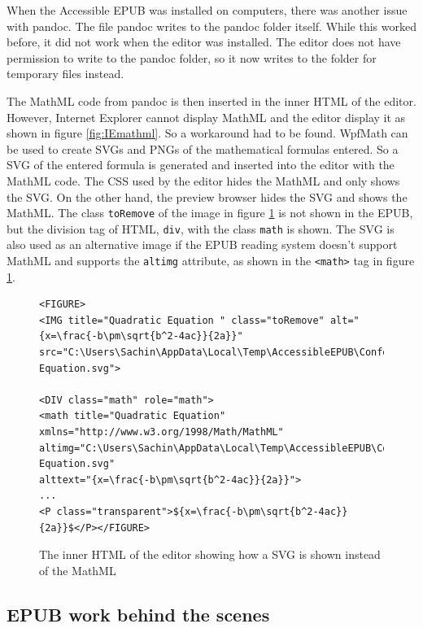 When the Accessible EPUB was installed on computers, there was another issue with pandoc. The file pandoc writes to the pandoc folder itself. While this worked before, it did not work when the editor was installed. The editor does not have permission to write to the pandoc folder, so it now writes to the folder for temporary files instead.

The MathML code from pandoc is then inserted in the inner HTML of the editor. However, Internet Explorer  cannot display MathML and the editor display it as shown in figure \ref{fig:IEmathml}. So a workaround had to be found. WpfMath can be used to create SVGs and PNGs of the mathematical formulas entered. So a SVG of the entered formula is generated and inserted into the editor with the MathML code. The CSS used by the editor hides the MathML and only shows the SVG. On the other hand, the preview browser hides the SVG and shows the MathML. The class \lstinline|toRemove| of the image in figure \ref{fig:mathSVG} is not shown in the EPUB, but the division tag of HTML, \lstinline|div|, with the class \lstinline|math| is shown. The SVG is also used as an alternative image if the EPUB reading system doesn't support MathML and supports the \lstinline|altimg| attribute,  as shown in the \lstinline|<math>| tag in figure \ref{fig:mathSVG}. 

\begin{figure}[h]
	
	\begin{lstlisting}
<FIGURE>
<IMG title="Quadratic Equation " class="toRemove" alt="{x=\frac{-b\pm\sqrt{b^2-4ac}}{2a}}" src="C:\Users\Sachin\AppData\Local\Temp\AccessibleEPUB\ConferenceTestJs\OEBPS\Images\Quadratic Equation.svg">

<DIV class="math" role="math">
<math title="Quadratic Equation" xmlns="http://www.w3.org/1998/Math/MathML" 
altimg="C:\Users\Sachin\AppData\Local\Temp\AccessibleEPUB\ConferenceTestJs\OEBPS\Images\Quadratic Equation.svg" 
alttext="{x=\frac{-b\pm\sqrt{b^2-4ac}}{2a}}">
...
<P class="transparent">${x=\frac{-b\pm\sqrt{b^2-4ac}}{2a}}$</P></FIGURE>

	\end{lstlisting}
\caption{The inner HTML of the editor showing how a SVG is shown instead of the MathML}
\label{fig:mathSVG}
\end{figure}

\subsection{EPUB work behind the scenes}

